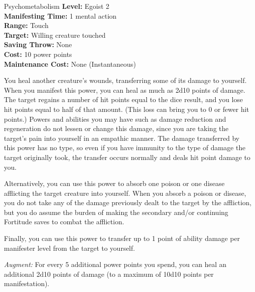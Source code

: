 {Psychometabolism}
{
	\textbf{Level:}
	Egoist 2\\
	\textbf{Manifesting Time:}
	1 mental action\\
	\textbf{Range:}
	Touch\\
	\textbf{Target:}
	Willing creature touched\\
	\textbf{Saving Throw:}
	None\\
	\textbf{Cost:}
	10 power points\\
	\textbf{Maintenance Cost:}
	None (Instantaneous)\\
}
{
	You heal another creature's wounds, transferring some of its damage to yourself. When you manifest this power, you can heal as much as 2d10 points of damage. The target regains a number of hit points equal to the dice result, and you lose hit points equal to half of that amount. (This loss can bring you to 0 or fewer hit points.) Powers and abilities you may have such as damage reduction and regeneration do not lessen or change this damage, since you are taking the target's pain into yourself in an empathic manner. The damage transferred by this power has no type, so even if you have immunity to the type of damage the target originally took, the transfer occurs normally and deals hit point damage to you.

	Alternatively, you can use this power to absorb one poison or one disease afflicting the target creature into yourself. When you absorb a poison or disease, you do not take any of the damage previously dealt to the target by the affliction, but you do assume the burden of making the secondary and/or continuing Fortitude saves to combat the affliction.

	Finally, you can use this power to transfer up to 1 point of ability damage per manifester level from the target to yourself.

	\textit{Augment:} For every 5 additional power points you spend, you can heal an additional 2d10 points of damage (to a maximum of 10d10 points per manifestation).
}